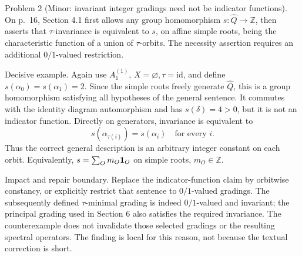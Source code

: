 \documentclass[10pt]{article}
\begin{document}
Problem 2 (Minor: invariant integer gradings need not be indicator functions).  On p. 16, Section 4.1 first allows any group homomorphism \(s:\widehat Q\to\mathbb Z\), then asserts that \(\tau\)-invariance is equivalent to \(s\), on affine simple roots, being the characteristic function of a union of \(\tau\)-orbits. The necessity assertion requires an additional \(0/1\)-valued restriction.\par
Decisive example. Again use \(A_1^{(1)}\), \(X=\varnothing,\tau=\mathrm{id}\), and define \(s(\alpha_0)=s(\alpha_1)=2\). Since the simple roots freely generate \(\widehat Q\), this is a group homomorphism satisfying all hypotheses of the general sentence. It commutes with the identity diagram automorphism and has \(s(\delta)=4>0\), but it is not an indicator function. Directly on generators, invariance is equivalent to \[s(\alpha_{\tau(i)})=s(\alpha_i)\quad\text{for every }i.\] Thus the correct general description is an arbitrary integer constant on each orbit. Equivalently, \(s=\sum_O m_O{\bf1}_O\) on simple roots, \(m_O\in\mathbb Z\).\par
Impact and repair boundary. Replace the indicator-function claim by orbitwise constancy, or explicitly restrict that sentence to \(0/1\)-valued gradings. The subsequently defined \(\tau\)-minimal grading is indeed \(0/1\)-valued and invariant; the principal grading used in Section 6 also satisfies the required invariance. The counterexample does not invalidate those selected gradings or the resulting spectral operators. The finding is local for this reason, not because the textual correction is short.\par
\end{document}
